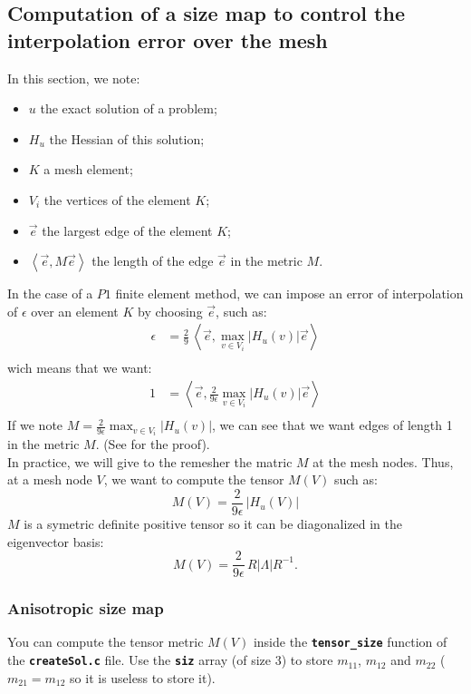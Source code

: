 \documentclass{article}
\newcommand{\ttb}[1]{\texttt{\textbf{#1}}}
\begin{document}
\subsection{Computation of a size map to control the interpolation error over the mesh}
In this section, we note:
\begin{itemize}
\item $u$ the exact solution of a problem;
\item $H_u$ the Hessian of this solution;
\item $K$ a mesh element;
\item $V_i$ the vertices of the element $K$;
\item $\vec{e}$ the largest edge of the element $K$;
\item $\left<\vec{e},M\vec{e}\right>$ the length of the edge $\vec{e}$ in the metric $M$.\\
\end{itemize}

In the case of a $P1$ finite element method, we can
impose an error of interpolation of $\epsilon$ over an element $K$ by
choosing $\vec{e}$, such as:
\begin{align*}
\epsilon &= \frac{2}{9} \, \left< \vec{e},\max_{v \in V_i} \left| H_u (v) \right| \vec{e} \right>\\
\end{align*}
wich means that we want:
\begin{align*}
1        &= \left< \vec{e},\frac{2}{9\epsilon}  \max_{v \in V_i} \left| H_u (v) \right| \vec{e} \right>\\
\end{align*}
If we note $M = \frac{2}{9\epsilon} \max_{v \in V_i} \left| H_u (v)
\right|$, we can see that we want edges of length 1 in the metric
$M$. (See \cite{AlauzetFrey} for the proof).\\

In practice, we will give to the remesher the matric $M$ at the mesh nodes.
Thus, at a mesh node $V$, we want to compute the tensor $M(V)$ such
as:
$$
M(V) = \frac{2}{9\epsilon} \, \left | H_u(V) \right |
$$
$M$ is a symetric definite positive tensor so it can be diagonalized in the eigenvector basis:
$$
M(V) = \frac{2}{9\epsilon} \, R
\left |\Lambda\right | R^{-1}.
$$

\subsubsection{Anisotropic size map}
You can compute the tensor metric $M(V)$ inside the \ttb{tensor\_size}
function of the \ttb{createSol.c} file. Use the \ttb{siz} array (of
size 3) to store $m_{11}$, $m_{12}$ and $m_{22}$ ($m_{21} = m_{12}$ so
it is useless to store it).\\
\end{document}
